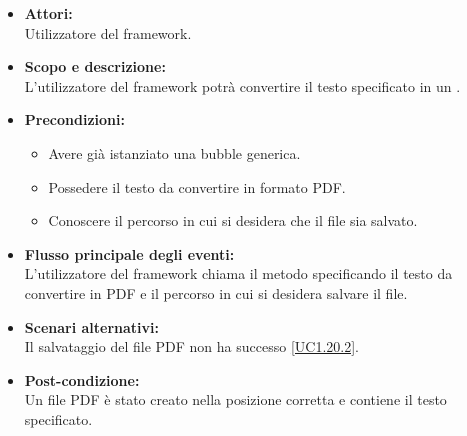 \begin{itemize}
	\item \textbf{Attori:}
	\\Utilizzatore del framework.
	\item \textbf{Scopo e descrizione:} 
	\\L'utilizzatore del framework potrà convertire il testo specificato in un .
	\item \textbf{Precondizioni:}
	\begin{itemize}
		\item Avere già istanziato una bubble generica.
		\item Possedere il testo da convertire in formato PDF.
		\item Conoscere il percorso in cui si desidera che il file sia salvato.
	\end{itemize}
	\item \textbf{Flusso principale degli eventi:}
	\\L'utilizzatore del framework chiama il metodo specificando il testo da convertire in PDF e il percorso in cui si desidera salvare il file.
	\item \textbf{Scenari alternativi:}
	\\Il salvataggio del file PDF non ha successo \ref{UC1.20.2}.
	\item \textbf{Post-condizione:}
	\\Un file PDF è stato creato nella posizione corretta e contiene il testo specificato.
\end{itemize}


